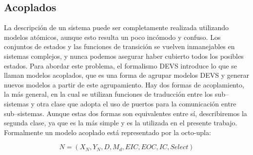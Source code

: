 \documentclass[a4paper,	11pt]{report}
\begin{document}
\subsection{Acoplados}
La descripción de un sistema puede ser completamente realizada utilizando modelos atómicos, aunque esto resulta un poco incómodo y confuso. Los conjuntos de estados y las funciones de transición se vuelven inmanejables en sistemas complejos, y nunca podemos asegurar haber cubierto todos los posibles estados.
Para abordar este problema, el formalismo DEVS introduce lo que se llaman modelos acoplados, que es una forma de agrupar modelos DEVS y generar nuevos modelos a partir de este agrupamiento.
Hay dos formas de acoplamiento, la más general, en la cual se utilizan funciones de traducción entre los sub–sistemas y otra clase que adopta el uso de puertos para la comunicación entre sub–sistemas. Aunque estas dos formas son equivalentes entre sí, describiremos la segunda clase, ya que es la más simple y es la utilizada en el presente trabajo.
Formalmente un modelo acoplado está representado por la octo-upla:

\begin{equation}
N = (X_N , Y_N , D, {M_d }, EIC, EOC, IC, Select)
\end{equation}
\end{document}
